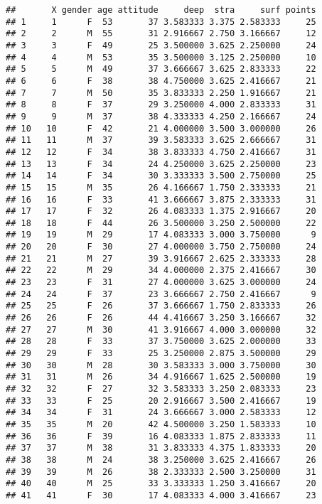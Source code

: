 \documentclass[
]{article}
\begin{document}
\begin{verbatim}
##       X gender age attitude     deep  stra     surf points
## 1     1      F  53       37 3.583333 3.375 2.583333     25
## 2     2      M  55       31 2.916667 2.750 3.166667     12
## 3     3      F  49       25 3.500000 3.625 2.250000     24
## 4     4      M  53       35 3.500000 3.125 2.250000     10
## 5     5      M  49       37 3.666667 3.625 2.833333     22
## 6     6      F  38       38 4.750000 3.625 2.416667     21
## 7     7      M  50       35 3.833333 2.250 1.916667     21
## 8     8      F  37       29 3.250000 4.000 2.833333     31
## 9     9      M  37       38 4.333333 4.250 2.166667     24
## 10   10      F  42       21 4.000000 3.500 3.000000     26
## 11   11      M  37       39 3.583333 3.625 2.666667     31
## 12   12      F  34       38 3.833333 4.750 2.416667     31
## 13   13      F  34       24 4.250000 3.625 2.250000     23
## 14   14      F  34       30 3.333333 3.500 2.750000     25
## 15   15      M  35       26 4.166667 1.750 2.333333     21
## 16   16      F  33       41 3.666667 3.875 2.333333     31
## 17   17      F  32       26 4.083333 1.375 2.916667     20
## 18   18      F  44       26 3.500000 3.250 2.500000     22
## 19   19      M  29       17 4.083333 3.000 3.750000      9
## 20   20      F  30       27 4.000000 3.750 2.750000     24
## 21   21      M  27       39 3.916667 2.625 2.333333     28
## 22   22      M  29       34 4.000000 2.375 2.416667     30
## 23   23      F  31       27 4.000000 3.625 3.000000     24
## 24   24      F  37       23 3.666667 2.750 2.416667      9
## 25   25      F  26       37 3.666667 1.750 2.833333     26
## 26   26      F  26       44 4.416667 3.250 3.166667     32
## 27   27      M  30       41 3.916667 4.000 3.000000     32
## 28   28      F  33       37 3.750000 3.625 2.000000     33
## 29   29      F  33       25 3.250000 2.875 3.500000     29
## 30   30      M  28       30 3.583333 3.000 3.750000     30
## 31   31      M  26       34 4.916667 1.625 2.500000     19
## 32   32      F  27       32 3.583333 3.250 2.083333     23
## 33   33      F  25       20 2.916667 3.500 2.416667     19
## 34   34      F  31       24 3.666667 3.000 2.583333     12
## 35   35      M  20       42 4.500000 3.250 1.583333     10
## 36   36      F  39       16 4.083333 1.875 2.833333     11
## 37   37      M  38       31 3.833333 4.375 1.833333     20
## 38   38      M  24       38 3.250000 3.625 2.416667     26
## 39   39      M  26       38 2.333333 2.500 3.250000     31
## 40   40      M  25       33 3.333333 1.250 3.416667     20
## 41   41      F  30       17 4.083333 4.000 3.416667     23

\end{verbatim}
\end{document}
